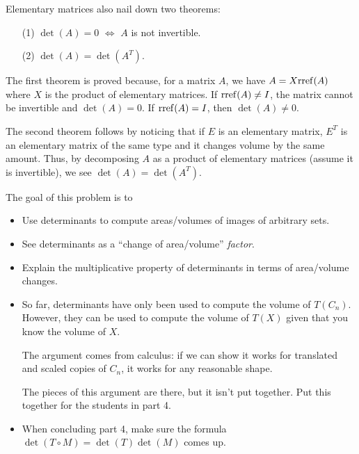 \begin{lesson}
	Elementary matrices also nail down two theorems:
	\begin{enumerate}
		\item[(1)] $\det(A) = 0$ $\iff$ $A$ is not invertible.
		\item[(2)] $\det(A)=\det(A^T)$.
	\end{enumerate}

	The first theorem is proved because, for a matrix $A$, we have $A=X\!\operatorname{rref}(A)$ where $X$ is the product of elementary matrices.
	If $\operatorname{rref}(A)\neq I$, the matrix cannot be invertible and $\det(A)=0$. If $\operatorname{rref}(A)=I$, then $\det(A)\neq 0$.

	The second theorem follows by noticing that if $E$ is an elementary matrix, $E^T$ is an elementary matrix 
	of the same type and it changes volume by the same amount. Thus, by decomposing $A$ as a product of elementary
	matrices (assume it is invertible), we see $\det(A)=\det(A^T)$.

\end{lesson}
	\bookonlynewpage
	\question
	\begin{annotation}
		\begin{goals}

			The goal of this problem is to
			\begin{itemize}
				\item Use determinants to compute areas/volumes of images of
					arbitrary sets.
				\item See determinants as a ``change of area/volume'' \emph{factor}.
				\item Explain the multiplicative property of determinants in
					terms of area/volume changes.
			\end{itemize}
		\end{goals}

		\begin{notes}
			\begin{itemize}
				\item So far, determinants have only been used to compute
					the volume of $T(C_n)$. However, they can be used to compute
					the volume of $T(X)$ given that you know the volume of $X$.

					The argument comes from calculus: if we can show it works
					for translated and scaled copies of $C_n$, it works for any 
					reasonable shape.

					The pieces of this argument are there, but it isn't put together.
					Put this together for the students in part 4.
				\item When concluding part 4, make sure the formula $\det(T\circ M)=
					\det(T)\det(M)$ comes up.
			\end{itemize}
		\end{notes}
	\end{annotation}
